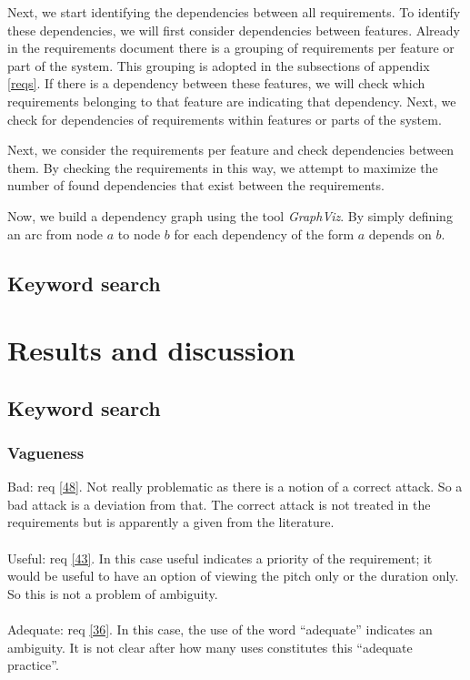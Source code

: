 \documentclass[a4paper,twoside, twocolumn,11pt]{article}
\numberwithin{equation}{section}
\begin{document}
Next, we start identifying the dependencies between all requirements. To identify these dependencies, we will first consider dependencies between features. Already in the requirements document \cite{VEMUS} there is a grouping of requirements per feature or part of the system. This grouping is adopted in the subsections of appendix \ref{reqs}. If there is a dependency between these features, we will check which requirements belonging to that feature are indicating that dependency. Next, we check for dependencies of requirements within features or parts of the system.

Next, we consider the requirements per feature and check dependencies between them. By checking the requirements in this way, we attempt to maximize the number of found dependencies that exist between the requirements.

Now, we build a dependency graph using the tool \textit{GraphViz}. By simply defining an arc from node $a$ to node $b$ for each dependency of the form $a$ depends on $b$.

\subsection{Keyword search}

\section{Results and discussion}
\subsection{Keyword search}
\subsubsection{Vagueness} 
Bad: req \ref{48}. Not really problematic as there is a notion of a correct attack. So a bad attack is a deviation from that. The correct attack is not treated in the requirements but is apparently a given from the literature.\\\\
Useful: req \ref{43}. In this case useful indicates a priority of the requirement; it would be useful to have an option of viewing the pitch only or the duration only. So this is not a problem of ambiguity.\\\\
Adequate: req \ref{36}. In this case, the use of the word ``adequate'' indicates an ambiguity. It is not clear after how many uses constitutes this ``adequate practice''.
\end{document}
